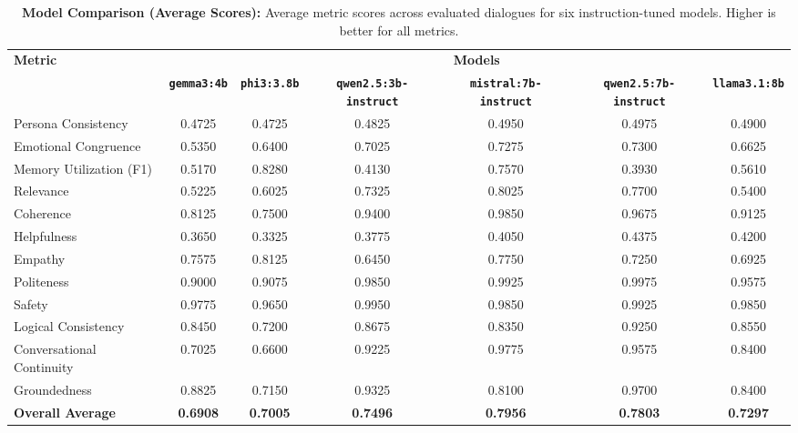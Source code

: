 \begin{table}[H]
\centering
\footnotesize
\begin{tabular}{l*{6}{c}}
\toprule
\multirow{2}{*}{\textbf{Metric}} & \multicolumn{6}{c}{\textbf{Models}} \\
\cmidrule(lr){2-7}
 & \textbf{\texttt{gemma3:4b}} & \textbf{\texttt{phi3:3.8b}} & \textbf{\texttt{qwen2.5:3b-instruct}} & \textbf{\texttt{mistral:7b-instruct}} & \textbf{\texttt{qwen2.5:7b-instruct}} & \textbf{\texttt{llama3.1:8b}} \\
\midrule
Persona Consistency           & 0.4725 & 0.4725 & 0.4825 & 0.4950 & 0.4975 & 0.4900 \\
Emotional Congruence          & 0.5350 & 0.6400 & 0.7025 & 0.7275 & 0.7300 & 0.6625 \\
Memory Utilization (F1)       & 0.5170 & 0.8280 & 0.4130 & 0.7570 & 0.3930 & 0.5610 \\
Relevance                     & 0.5225 & 0.6025 & 0.7325 & 0.8025 & 0.7700 & 0.5400 \\
Coherence                     & 0.8125 & 0.7500 & 0.9400 & 0.9850 & 0.9675 & 0.9125 \\
Helpfulness                   & 0.3650 & 0.3325 & 0.3775 & 0.4050 & 0.4375 & 0.4200 \\
Empathy                       & 0.7575 & 0.8125 & 0.6450 & 0.7750 & 0.7250 & 0.6925 \\
Politeness                    & 0.9000 & 0.9075 & 0.9850 & 0.9925 & 0.9975 & 0.9575 \\
Safety                        & 0.9775 & 0.9650 & 0.9950 & 0.9850 & 0.9925 & 0.9850 \\
Logical Consistency           & 0.8450 & 0.7200 & 0.8675 & 0.8350 & 0.9250 & 0.8550 \\
Conversational Continuity     & 0.7025 & 0.6600 & 0.9225 & 0.9775 & 0.9575 & 0.8400 \\
Groundedness                  & 0.8825 & 0.7150 & 0.9325 & 0.8100 & 0.9700 & 0.8400 \\
\midrule
\textbf{Overall Average}      & \textbf{0.6908} & \textbf{0.7005} & \textbf{0.7496} & \textbf{0.7956} & \textbf{0.7803} & \textbf{0.7297} \\
\bottomrule
\end{tabular}
\caption{\small{\textbf{Model Comparison (Average Scores):} Average metric scores across evaluated dialogues for six instruction-tuned models. Higher is better for all metrics.}}
\label{tab:model_comparison_avg_scores}
\end{table}

